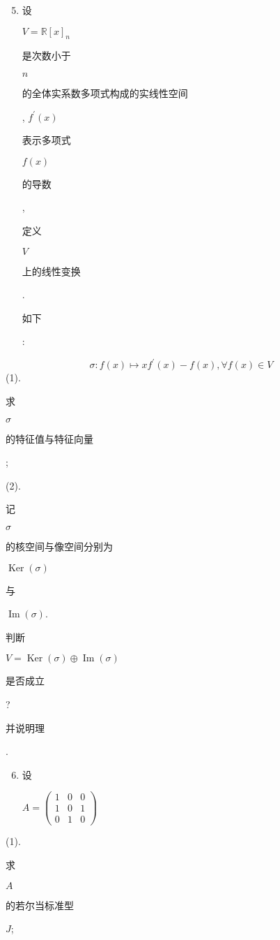 \documentclass[10pt]{article}
\begin{document}
\begin{enumerate}
  \setcounter{enumi}{4}
  \item \begin{CJK}{UTF8}{mj}设\end{CJK} $V=\mathbb{R}[x]_{n}$ \begin{CJK}{UTF8}{mj}是次数小于\end{CJK} $n$ \begin{CJK}{UTF8}{mj}的全体实系数多项式构成的实线性空间\end{CJK}, $f^{\prime}(x)$ \begin{CJK}{UTF8}{mj}表示多项式\end{CJK} $f(x)$ \begin{CJK}{UTF8}{mj}的导数\end{CJK}, \begin{CJK}{UTF8}{mj}定义\end{CJK} $V$ \begin{CJK}{UTF8}{mj}上的线性变换\end{CJK}. \begin{CJK}{UTF8}{mj}如下\end{CJK}:
\end{enumerate}
$$
\sigma: f(x) \mapsto x f^{\prime}(x)-f(x), \forall f(x) \in V
$$
(1). \begin{CJK}{UTF8}{mj}求\end{CJK} $\sigma$ \begin{CJK}{UTF8}{mj}的特征值与特征向量\end{CJK};

(2). \begin{CJK}{UTF8}{mj}记\end{CJK} $\sigma$ \begin{CJK}{UTF8}{mj}的核空间与像空间分别为\end{CJK} $\operatorname{Ker}(\sigma)$ \begin{CJK}{UTF8}{mj}与\end{CJK} $\operatorname{Im}(\sigma)$. \begin{CJK}{UTF8}{mj}判断\end{CJK} $V=\operatorname{Ker}(\sigma) \oplus \operatorname{Im}(\sigma)$ \begin{CJK}{UTF8}{mj}是否成立\end{CJK}? \begin{CJK}{UTF8}{mj}并说明理\end{CJK}.

\begin{enumerate}
  \setcounter{enumi}{5}
  \item \begin{CJK}{UTF8}{mj}设\end{CJK} $A=\left(\begin{array}{lll}1 & 0 & 0 \\ 1 & 0 & 1 \\ 0 & 1 & 0\end{array}\right)$
\end{enumerate}
(1). \begin{CJK}{UTF8}{mj}求\end{CJK} $A$ \begin{CJK}{UTF8}{mj}的若尔当标准型\end{CJK} $J$;
\end{document}
